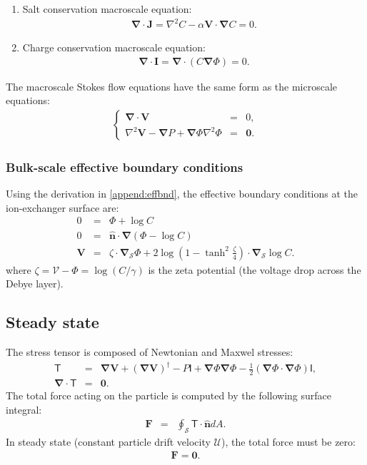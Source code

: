 \documentclass[final]{elsarticle}
\newcommand{\brc}[2]{\left\{\begin{array}{#1}#2\end{array}\right.}
\newcommand{\pars}[1]{\left(#1\right)}
\newcommand\Laplacian{\nabla^2}
\newcommand\bnabla{\boldsymbol{\nabla}}
\newcommand\bV{\boldsymbol{V}}
\newcommand\bF{\boldsymbol{F}}
\newcommand\bI{\boldsymbol{I}}
\newcommand\bJ{\boldsymbol{J}}
\newcommand\bnhat{\hat{\boldsymbol{n}}}
\newcommand\bzero{\boldsymbol{0}}
\newcommand\cU{\mathscr{U}}
\newcommand\cV{\mathscr{V}}
\newcommand\tI{\mathsf{I}}
\newcommand\tT{\mathsf{T}}
\begin{document}
\begin{enumerate}
\item Salt conservation macroscale equation:
\begin{eqnarray} \label{eq:salt}
\bnabla \cdot \bJ = \Laplacian C - \alpha \bV \cdot \bnabla C = 0. 
\end{eqnarray}

\item Charge conservation macroscale equation:
\begin{eqnarray} \label{eq:charge}
\bnabla \cdot \bI = \bnabla \cdot \pars{ C \bnabla \varPhi } = 0.
\end{eqnarray}

\end{enumerate}

The macroscale Stokes flow equations have the same form as the microscale equations:
\begin{eqnarray}  \label{eq:stokes}
\brc{rcc}{\bnabla \cdot \bV &=& 0, \\  
\Laplacian \bV - \bnabla P + \bnabla \varPhi \Laplacian \varPhi &=& \bzero.}
\end{eqnarray}

\subsubsection{Bulk-scale effective boundary conditions}

Using the derivation in \ref{append:effbnd}, the effective boundary conditions at the
ion-exchanger surface are:
\begin{eqnarray}
0 &=& \varPhi + \log C \\
0 &=& \bnhat \cdot \bnabla \pars{\varPhi - \log C} \\
\bV &=& 
\zeta \cdot \bnabla_\mathcal{S} \varPhi 
+ 2\log\pars{1-\tanh^2\frac{\zeta}{4}} \cdot \bnabla_\mathcal{S} \log C.
\end{eqnarray}
where $\zeta = \cV - \varPhi = \log (C / \gamma)$ 
is the zeta potential (the voltage drop across the Debye layer).

\subsection{Steady state}
The stress tensor is composed of Newtonian and Maxwel stresses:
\begin{eqnarray*}
\tT &=& \bnabla \bV + (\bnabla \bV)^\dagger - P \tI
+ \bnabla \varPhi \bnabla \varPhi - \frac{1}{2} (\bnabla \varPhi \cdot \bnabla \varPhi) \tI, \\
\bnabla \cdot \tT &=& \bzero.
\end{eqnarray*}
The total force acting on the particle is computed by the following surface integral:
\begin{eqnarray*}
\bF &=& \oint_\mathcal{S} \tT \cdot \bnhat dA.
\end{eqnarray*}
In steady state (constant particle drift velocity $\cU$), 
the total force must be zero: 
\begin{eqnarray*}
\bF = \bzero.
\end{eqnarray*}
\end{document}

